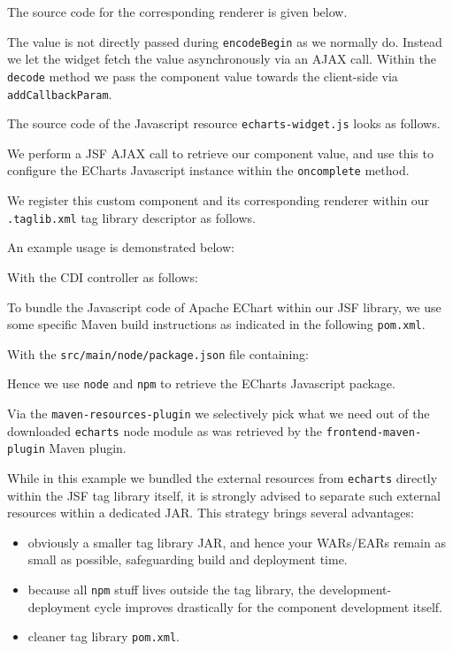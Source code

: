 The source code for the corresponding renderer is given below.

The value is not directly passed during \texttt{encodeBegin} as we normally do.
Instead we let the widget fetch the value asynchronously via an AJAX call.
Within the \texttt{decode} method we pass the component value towards the client-side via \texttt{addCallbackParam}.

The source code of the Javascript resource \texttt{echarts-widget.js} looks as follows.

We perform a JSF AJAX call to retrieve our component value, and use this to configure the ECharts Javascript instance within the \texttt{oncomplete} method.

We register this custom component and its corresponding renderer within our \texttt{.taglib\allowbreak .xml} tag library descriptor as follows.


An example usage is demonstrated below:


With the CDI controller as follows:


To bundle the Javascript code of Apache EChart within our JSF library, we use some specific Maven build instructions as indicated in the following \texttt{pom.xml}.

With the \texttt{src/main/node/package.json} file containing:

Hence we use \texttt{node} and \texttt{npm} to retrieve the ECharts Javascript package.

Via the \texttt{maven-resources-plugin} we selectively pick what we need out of the downloaded \texttt{echarts} node module as was retrieved by the \texttt{frontend-maven-plugin} Maven plugin.

While in this example we bundled the external resources from \texttt{echarts} directly within the JSF tag library itself,
it is strongly advised to separate such external resources within a dedicated JAR.
This strategy brings several advantages:
\begin{itemize}
	\item obviously a smaller tag library JAR, and hence your WARs/EARs remain as small as possible, safeguarding build and deployment time.
	\item because all \texttt{npm} stuff lives outside the tag library, the development-deployment cycle improves drastically for the component development itself.
	\item cleaner tag library \texttt{pom.xml}.
\end{itemize}